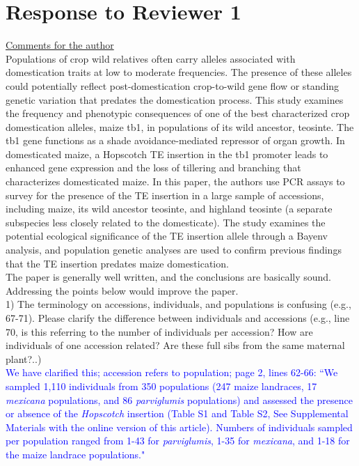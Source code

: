 \documentclass[11pt]{article}
\newcommand{\res}[1]{\noindent \textcolor{blue}{{#1}} \\}
\begin{document}
\section*{Response to Reviewer 1}

\underline{Comments for the author}\\

Populations of crop wild relatives often carry alleles associated with domestication traits at low to moderate frequencies. The presence of these alleles could potentially reflect post-domestication crop-to-wild gene flow or standing genetic variation that predates the domestication process. This study examines the frequency and phenotypic consequences of one of the best characterized crop domestication alleles, maize tb1, in populations of its wild ancestor, teosinte. The tb1 gene functions as a shade avoidance-mediated repressor of organ growth. In domesticated maize, a Hopscotch TE insertion in the tb1 promoter leads to enhanced gene expression and the loss of tillering and branching that characterizes domesticated maize. In this paper, the authors use PCR assays to survey for the presence of the TE insertion in a large sample of accessions, including maize, its wild ancestor teosinte, and highland teosinte (a separate subspecies less closely related to the domesticate). The study examines the potential ecological significance of the TE insertion allele through a Bayenv analysis, and population genetic analyses are used to confirm previous findings that the TE insertion predates maize domestication.\\ 

The paper is generally well written, and the conclusions are basically sound. Addressing the points below would improve the paper. \\

1) The terminology on accessions, individuals, and populations is confusing (e.g., 67-71). Please clarify the difference between individuals and accessions (e.g., line 70‚ is this referring to the number of individuals per accession? How are individuals of one accession related? Are these full sibs from the same maternal plant?..) \\

\res{We have clarified this; accession refers to population; page 2, lines 62-66: ``We sampled 1,110 individuals from 350 populations (247 maize landraces, 17 \emph{mexicana} populations, and 86 \emph{parviglumis} populations) and assessed the presence or absence of the \emph{Hopscotch} insertion (Table S1 and Table S2, See Supplemental Materials with the online version of this article). Numbers of individuals sampled per population ranged from 1-43 for \emph{parviglumis}, 1-35 for \emph{mexicana}, and 1-18 for the maize landrace populations."}
\end{document}
